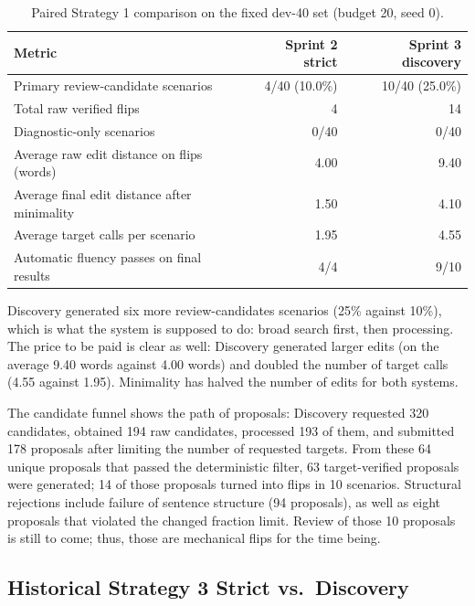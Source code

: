 \documentclass[11pt,a4paper]{article}
\begin{document}
\begin{table}[htbp]
\centering
\small
\begin{tabularx}{\textwidth}{@{}Y r r@{}}
\toprule
\textbf{Metric} & \textbf{Sprint 2 strict} & \textbf{Sprint 3 discovery} \\
\midrule
Primary review-candidate scenarios & 4/40 (10.0\%) & 10/40 (25.0\%) \\
Total raw verified flips & 4 & 14 \\
Diagnostic-only scenarios & 0/40 & 0/40 \\
Average raw edit distance on flips (words) & 4.00 & 9.40 \\
Average final edit distance after minimality & 1.50 & 4.10 \\
Average target calls per scenario & 1.95 & 4.55 \\
Automatic fluency passes on final results & 4/4 & 9/10 \\
\bottomrule
\end{tabularx}
\caption{Paired Strategy 1 comparison on the fixed dev-40 set (budget 20, seed 0).}
\label{tab:s1}
\end{table}

Discovery generated six more review-candidates scenarios (25\% against 10\%), which
is what the system is supposed to do: broad search first, then processing. The price
to be paid is clear as well: Discovery generated larger edits (on the average 9.40
words against 4.00 words) and doubled the number of target calls (4.55 against 1.95).
Minimality has halved the number of edits for both systems.

The candidate funnel shows the path of proposals: Discovery requested 320 candidates,
obtained 194 raw candidates, processed 193 of them, and submitted 178 proposals after
limiting the number of requested targets. From these 64 unique proposals that passed
the deterministic filter, 63 target-verified proposals were generated; 14 of those
proposals turned into flips in 10 scenarios. Structural rejections include failure of
sentence structure (94 proposals), as well as eight proposals that violated the
changed fraction limit. Review of those 10 proposals is still to come; thus, those are
mechanical flips for the time being.

\subsection{Historical Strategy 3 Strict vs.\ Discovery}
\label{sec:s3results}
\end{document}

